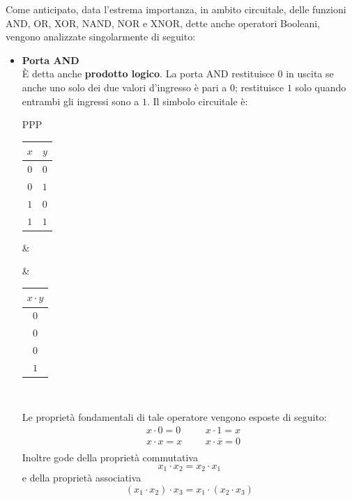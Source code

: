 \documentclass[a4paper]{extarticle}
\begin{document}
\noindent
Come anticipato, data l'estrema importanza, in ambito circuitale, delle funzioni AND, OR, XOR, NAND, NOR e XNOR, dette anche operatori Booleani, vengono analizzate singolarmente di seguito:

\begin{itemize}
    \item \textbf{Porta AND}\\
    È detta anche \textbf{prodotto logico}. La porta AND restituisce \(0\) in uscita se anche uno solo dei due valori d’ingresso è pari a \(0\); restituisce \(1\) solo quando entrambi gli ingressi sono a \(1\). Il simbolo circuitale è:

    \vspace{1em}
    \noindent
    \begin{tabularx}{\textwidth}{PPP}
    {
        \begin{tabular}{c|c}
             \(x\) & \(y\)\\
             \hline
             $0$ & $0$\\
             $0$ & $1$\\
             $1$ & $0$\\
             $1$ & $1$
        \end{tabular}
    }
    &
    {
    }
    &
    {
        \begin{tabular}{c}
             \(x \cdot y\)\\
             \hline
             $0$\\
             $0$\\
             $0$\\
             $1$
        \end{tabular}
    }\\
    \end{tabularx}
    \vspace{1em}
    \noindent
    Le proprietà fondamentali di tale operatore vengono esposte di seguito:
    \begin{align*}
        &x \cdot 0 = 0 && &x \cdot 1 =x\\
        &x \cdot x = x && &x \cdot \overline{x}=0\\
    \end{align*}
    Inoltre gode della proprietà commutativa
    \[x_1 \cdot x_2 = x_2 \cdot x_1\]
    e della proprietà associativa
    \[(x_1 \cdot x_2) \cdot x_3 = x_1 \cdot (x_2 \cdot x_3)\]


\end{itemize}
\end{document}
